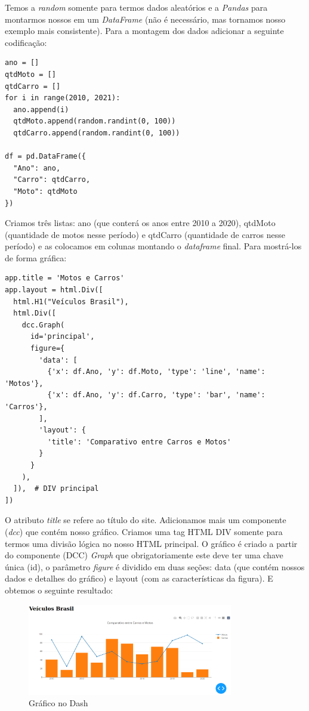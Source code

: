 \documentclass[a4paper,11pt]{article}
\begin{document}
Temos a \textit{random} somente para termos dados aleatórios e a \textit{Pandas} para montarmos nossos em um \textit{DataFrame} (não é necessário, mas tornamos nosso exemplo mais consistente). Para a montagem dos dados adicionar a seguinte codificação:
\begin{lstlisting}[]
ano = []
qtdMoto = []
qtdCarro = []
for i in range(2010, 2021):
  ano.append(i)
  qtdMoto.append(random.randint(0, 100))
  qtdCarro.append(random.randint(0, 100))
  
df = pd.DataFrame({
  "Ano": ano,
  "Carro": qtdCarro,
  "Moto": qtdMoto
})
\end{lstlisting}

Criamos três listas: ano (que conterá os anos entre 2010 a 2020), qtdMoto (quantidade de motos nesse período) e qtdCarro (quantidade de carros nesse período) e as colocamos em colunas montando o \textit{dataframe} final. Para mostrá-los de forma gráfica:

\begin{lstlisting}[]
app.title = 'Motos e Carros'
app.layout = html.Div([
  html.H1("Veículos Brasil"),
  html.Div([
    dcc.Graph(
      id='principal',
      figure={
  	    'data': [
	      {'x': df.Ano, 'y': df.Moto, 'type': 'line', 'name': 'Motos'},
	      {'x': df.Ano, 'y': df.Carro, 'type': 'bar', 'name': 'Carros'},
	    ],
	    'layout': {
	      'title': 'Comparativo entre Carros e Motos'
	    }
      }
    ),
  ]),  # DIV principal
])
\end{lstlisting}

O atributo \textit{title} se refere ao título do site. Adicionamos mais um componente (\textit{dcc}) que contém nosso gráfico. Criamos uma tag HTML DIV somente para termos uma divisão lógica no nosso HTML principal. O gráfico é criado a partir do componente (DCC) \textit{Graph} que obrigatoriamente este deve ter uma chave única (id), o parâmetro \textit{figure} é dividido em duas seções: data (que contém nossos dados e detalhes do gráfico) e layout (com as características da figura). E obtemos o seguinte resultado:
\begin{figure}[H]
	\centering
	\includegraphics[width=0.8\textwidth]{imagem/grafico1}
	\caption{Gráfico no Dash}
\end{figure}
\end{document}
